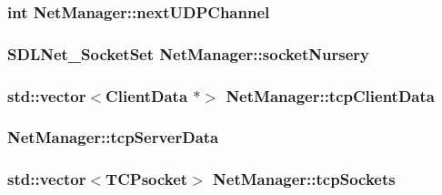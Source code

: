 \hypertarget{classNetManager_a7505bdde90a24b85b6cb1d8d81404c5f}{
\subsubsection[{next\-U\-D\-P\-Channel}]{\setlength{\rightskip}{0pt plus 5cm}int Net\-Manager\-::next\-U\-D\-P\-Channel\hspace{0.3cm}{\ttfamily [private]}}}\label{classNetManager_a7505bdde90a24b85b6cb1d8d81404c5f}
\hypertarget{classNetManager_adc43306f83c33feb0fdd74e16c6583bb}{
\subsubsection[{socket\-Nursery}]{\setlength{\rightskip}{0pt plus 5cm}S\-D\-L\-Net\-\_\-\-Socket\-Set Net\-Manager\-::socket\-Nursery\hspace{0.3cm}{\ttfamily [private]}}}\label{classNetManager_adc43306f83c33feb0fdd74e16c6583bb}
\hypertarget{classNetManager_a3303746abef87426cab748c92d58006b}{
\subsubsection[{tcp\-Client\-Data}]{\setlength{\rightskip}{0pt plus 5cm}std\-::vector$<${\bf Client\-Data} $\ast$$>$ Net\-Manager\-::tcp\-Client\-Data}}\label{classNetManager_a3303746abef87426cab748c92d58006b}
\hypertarget{classNetManager_abca113fc17fe6251fa7ac5a1179ade3c}{
\subsubsection[{tcp\-Server\-Data}]{ Net\-Manager\-::tcp\-Server\-Data}}\label{classNetManager_abca113fc17fe6251fa7ac5a1179ade3c}
\hypertarget{classNetManager_a2314a1df7704bbc4c96d8d0133d78ee6}{
\subsubsection[{tcp\-Sockets}]{\setlength{\rightskip}{0pt plus 5cm}std\-::vector$<$T\-C\-Psocket$>$ Net\-Manager\-::tcp\-Sockets\hspace{0.3cm}{\ttfamily [private]}}}\label{classNetManager_a2314a1df7704bbc4c96d8d0133d78ee6}
